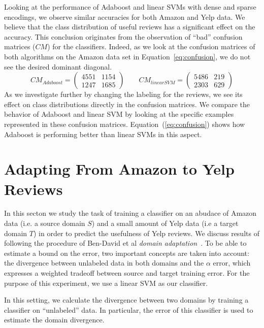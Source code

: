 \documentclass[letterpaper]{article}
\begin{document}
Looking at the performance of Adaboost and linear SVMs with dense and
sparse encodings, we observe similar accuracies for both Amazon and
Yelp data. We believe that the class distribution of useful reviews has 
a significant effect on the accuracy. This conclusion originates from 
the observation of ``bad'' confusion matrices ($CM$) for the classifiers. 
Indeed, as we look at the confusion matrices of both algorithms on the 
Amazon data set in Equation~\ref{eq:confusion}, we do not see the desired 
dominant diagonal.
\begin{equation}
\label{eq:confusion}
CM_{Adaboost} = \left(
\begin{matrix}
4551 & 1154\\
1247 & 1685
\end{matrix}
\right)
\qquad
CM_{linearSVM} = \left(
\begin{matrix}
5486 & 219\\
2303 & 629
\end{matrix}
\right)
\end{equation}
As we investigate further by changing the labeling for the reviews, we
see its effect on class distributions directly in the confusion
matrices. We compare the behavior of Adaboost and linear SVM by
looking at the specific examples represented in these confusion
matrices. Equation~(\ref{eq:confusion}) shows how Adaboost is
performing better than linear SVMs in this aspect.

\section{Adapting From Amazon to Yelp Reviews}
\label{sec:background}

In this secton we study the task of training a classifier on an abudace of
Amazon data (i.e. a source domain $S$) and a small amount of Yelp data (i.e 
a target domain $T$) in order to predict the usefulness
of Yelp reviews. We discuss results of following the procedure of Ben-David 
et al \emph{domain adaptation}~\cite{JennLearnDiffDomains}.  To be able to 
estimate a bound on the error, two important concepts are taken into account: 
the divergence between unlabeled data in both domains and the $\alpha$ error,
which expresses a weighted tradeoff between source and target training error.
For the purpose of this experiment, we use a linear SVM as our classifier.

In this setting, we calculate the divergence between two domains by
training a classifier on ``unlabeled'' data. In particular, the error of 
this classifier is used to estimate the domain divergence.
\end{document}
